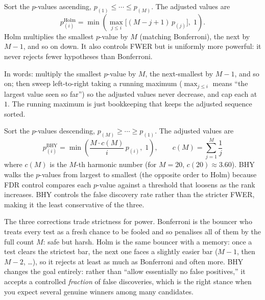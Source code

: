 \begin{definition}
Sort the $p$-values ascending, $p_{(1)} \le \cdots \le p_{(M)}$. The adjusted values are
\begin{equation}
\label{eq:eval-holm}
p_{(i)}^{\text{Holm}} = \min\!\left(\max_{j \le i}\bigl[(M - j + 1)\,p_{(j)}\bigr],\; 1\right).
\end{equation}
Holm multiplies the smallest $p$-value by $M$ (matching Bonferroni), the next by $M-1$, and so on down. It also controls FWER but is uniformly more powerful: it never rejects fewer hypotheses than Bonferroni.

In words: multiply the smallest $p$-value by $M$, the next-smallest by $M-1$, and so on; then sweep left-to-right taking a running maximum ($\max_{j\le i}$ means ``the largest value seen so far'') so the adjusted values never decrease, and cap each at $1$. The running maximum is just bookkeeping that keeps the adjusted sequence sorted.
\end{definition}

\begin{definition}
Sort the $p$-values descending, $p_{(M)} \ge \cdots \ge p_{(1)}$. The adjusted values are
\begin{equation}
\label{eq:eval-bhy}
p_{(i)}^{\text{BHY}} = \min\!\left(\frac{M \cdot c(M)}{i}\,p_{(i)},\; 1\right),
\qquad c(M) = \sum_{j=1}^{M}\frac{1}{j}
\end{equation}
where $c(M)$ is the $M$-th harmonic number (for $M=20$, $c(20)\approx 3.60$).
BHY walks the $p$-values from largest to smallest (the opposite order to Holm) because FDR control compares each $p$-value against a threshold that loosens as the rank increases.
BHY controls the false discovery rate rather than the stricter FWER, making it the least conservative of the three.
\end{definition}

\begin{intuition}
The three corrections trade strictness for power.
Bonferroni is the bouncer who treats every test as a fresh chance to be fooled and so penalises all of them by the full count $M$: safe but harsh.
Holm is the same bouncer with a memory: once a test clears the strictest bar, the next one faces a slightly easier bar ($M-1$, then $M-2$, \ldots), so it rejects at least as much as Bonferroni and often more.
BHY changes the goal entirely: rather than ``allow essentially no false positives,'' it accepts a controlled \emph{fraction} of false discoveries, which is the right stance when you expect several genuine winners among many candidates.
\end{intuition}

